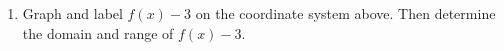 \begin{enumerate}
\begin{enumerate}
\begin{tikzpicture}[y=.5cm, x=0.5cm,font=\sffamily]
  \end{tikzpicture}

\vfill
\item Graph and label $f(x)-3$ on the coordinate system above.  Then determine the domain and range of $f(x)-3$.\vfill
\vfill
\end{enumerate}






\end{enumerate}



